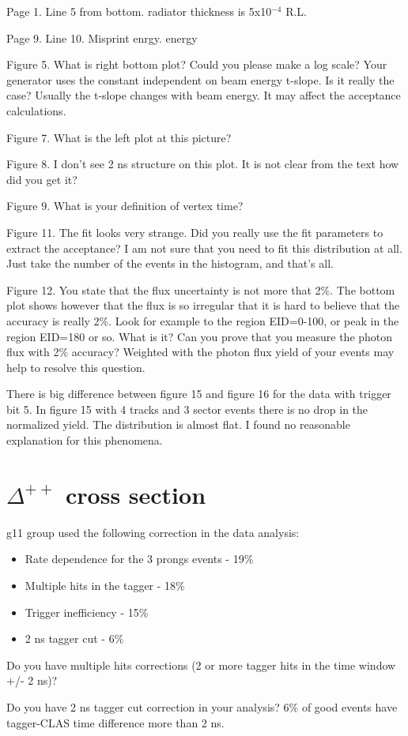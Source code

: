 \documentclass[12pt]{article}
\begin{document}
Page 1. Line 5 from bottom. radiator thickness is 5x10$^{-4}$ R.L.

Page 9. Line 10.   Misprint enrgy.  energy

Figure 5. What is right bottom plot? Could you please make a log scale?
Your generator uses the constant independent on beam energy t-slope. Is it really the case?
Usually the t-slope changes with beam energy. It may affect the acceptance calculations.

Figure 7. What is the left plot at this picture?

Figure 8. I don't see 2 ns structure on this plot. It is not clear from the text how did you get it?

Figure 9. What is your definition of vertex time?

Figure 11. The fit looks very strange. Did you really use the fit parameters to extract the acceptance?
I am not sure that you need to fit this distribution at all. Just take the number of the events in the histogram, and that's all.

Figure 12. You state that the flux uncertainty is not more that 2\%. The bottom plot shows however that the
flux is so irregular that it is hard to believe that the accuracy is really 2\%. Look for example to the
region EID=0-100, or peak in the region EID=180 or so. What is it? Can you prove that you measure the photon flux with 2\% accuracy? Weighted with the photon flux yield of your events may help to resolve this question.
    
There is big difference between figure 15 and figure 16 for the data with trigger bit 5. 
In figure 15 with 4 tracks and 3 sector events there is no drop in the normalized yield.
The distribution is almost flat. I found no reasonable explanation for this phenomena.

\section*{$\Delta^{++}$ cross section}

g11 group used the following correction in the data analysis:

\begin{itemize}
\item Rate dependence for the 3 prongs events - 19\%
\item  Multiple hits in the tagger   			          - 18\%
\item Trigger inefficiency                     			- 15\%
\item 2  ns tagger cut                   			  -  6\%
\end{itemize}

Do you have multiple hits corrections (2 or more tagger hits in the time window +/- 2 ns)?

Do you have 2 ns tagger cut correction in your analysis? 6\% of good events have tagger-CLAS time difference more than 2 ns.
\end{document}
